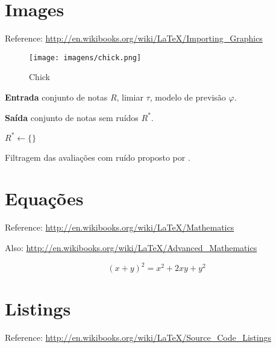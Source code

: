 \section{Images}\label{sec:LABEL_CHP_2_SEC_B}
Reference: \url{http://en.wikibooks.org/wiki/LaTeX/Importing_Graphics}

\begin{figure}
  \centering
  \texttt{[image: imagens/chick.png]}
  \caption{Chick}
  \label{fig:LABEL_FIG_1}
\end{figure}

\begin{algorithm}[H]

\textbf{Entrada} conjunto de notas $R$, limiar $\tau$, modelo de previsão $\varphi$.

\textbf{Saída} conjunto de notas sem ruídos $R^{*}$.

$R^{*} \gets \{\}$

\caption{Filtragem das avaliações com ruído proposto por \cite{OMahony2006}.}
\label{alg:mahony}
\end{algorithm}

\section{Equações}
Reference: \url{http://en.wikibooks.org/wiki/LaTeX/Mathematics}

Also: \url{http://en.wikibooks.org/wiki/LaTeX/Advanced_Mathematics}

\begin{equation}
  (x + y)^2 = x^2 + 2xy + y^2
  \label{eq:LABEL_EQ_1}
\end{equation}

\section{Listings}\label{sec:LABEL_CHP_2_SEC_D}
Reference: \url{http://en.wikibooks.org/wiki/LaTeX/Source_Code_Listings}



